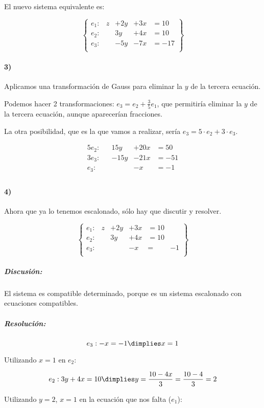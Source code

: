 \documentclass[palatino,nosec]{Docencia}
\begin{document}
\begin{problem}
El nuevo sistema equivalente es:

\[
\left\{\begin{array}{lcccl}
e_1: & z&+ 2y&+3x &=10\\
e_2: & &3y&+4x&=10\\
e_3: & &-5y&-7x&=-17\\
\end{array}\right\}
\]


\paragraph{3)} Aplicamos una transformación de Gauss para eliminar la $y$ de la tercera ecuación. 

Podemos hacer 2 transformaciones: $e_3 = e_2+\frac{3}{5}e_1$, que permitiría eliminar la $y$ de la tercera ecuación, aunque aparecerían fracciones.

La otra posibilidad, que es la que vamos a realizar, sería $e_3=5·e_2+3·e_3$. 

\[
\begin{array}{lcccl}
5e_2: & &15y&+20x&=50\\
3e_3: & &-15y&-21x&=-51\\
\hline
e_3: &&&-x&=-1\\
\end{array}
\]	

\paragraph{4)}

Ahora que ya lo tenemos escalonado, sólo hay que discutir y resolver. 

\[
\left\{\begin{array}{lccccc}
e_1: & z&+ 2y&+3x &=10\\
e_2: & &3y&+4x&=10\\
e_3: &&&-x&=&-1\\
\end{array}\right\}
\]

\subparagraph*{Discusión:} El sistema es compatible determinado, porque es un sistema escalonado con ecuaciones compatibles.


\subparagraph*{Resolución:}

\[e_3: -x=-1 \dimplies x=1\]

Utilizando $x=1$ en $e_2$:


\[
	e_2: 3y+4x=10 \dimplies y=\frac{10-4x}{3} = \frac{10-4}{3} = 2
\]

Utilizando $y=2$, $x=1$ en la ecuación que nos falta ($e_1$):


\end{problem}
\end{document}
